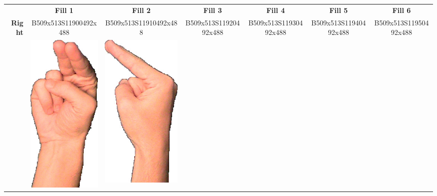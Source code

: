\documentclass{article}
\begin{document}
\begin{center}
\begin{tabular}{r*{6}{c}}
&\textbf{Fill 1}&\textbf{Fill 2}&\textbf{Fill 3}&\textbf{Fill 4}&\textbf{Fill 5}&\textbf{Fill 6}\\
\multirow{2}{*}{\textbf{Right}}&
B509x513S11900492x488&
B509x513S11910492x488&
B509x513S11920492x488&
B509x513S11930492x488&
B509x513S11940492x488&
B509x513S11950492x488\\
&
\includegraphics[scale=0.1]{images/02-05-1.jpg}&
\includegraphics[scale=0.1]{images/02-05-2.jpg}&

\end{tabular}
\end{center}
\end{document}
